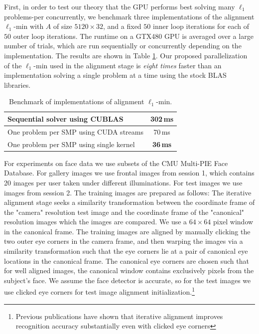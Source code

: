 \documentclass[10pt,twocolumn,letterpaper]{article}
\begin{document}
First, in order to test our theory that the GPU performs best solving many
$\ell_1$ problems-per concurrently, we benchmark three implementations of the
alignment $\ell_1$-min with $A$ of size $5120 \times 32$, and a fixed
$50$ inner loop iterations for each of $50$ outer loop iterations. The runtime
on a GTX480 GPU is averaged over a large number of trials, which are run
sequentially or concurrently depending on the implementation.
The results are shown in Table \ref{tbl:ubench}.
Our proposed parallelization of the $\ell_1$-min used in the alignment
stage is {\em eight times} faster than an implementation solving a single
problem at a time using the stock BLAS libraries.
\begin{table}[h!]
\caption{Benchmark of implementations of alignment $\ell_1$-min.}
\begin{tabular}{|l|c|}
\hline
Sequential solver using CUBLAS & 302\,ms \\
\hline
One problem per SMP using CUDA streams & 70\,ms  \\
\hline
One problem per SMP using single kernel & {\bf 36\,ms} \\
\hline
\end{tabular}
\label{tbl:ubench}
\end{table}
 
For experiments on face data we use subsets of the CMU Multi-PIE Face Database.
For gallery images we use frontal images from session 1, which contains 20
images per user taken under different illuminations. For test images we use
images from session 2.  The training images are prepared as follows:
The iterative alignment stage seeks a similarity
transformation between the coordinate frame of the "camera" resolution test
image and the coordinate frame of the "canonical" resolution images which the
images are compared.  We use a $64 \times 64$ pixel window in the canonical
frame.  The training images are aligned by manually clicking the two outer eye
corners in the camera frame, and then warping the images via a similarity
transformation such that the eye corners lie at a pair of canonical eye
locations in the canonical frame.  The canonical eye corners are chosen such
that for well aligned images, the canonical window contains exclusively pixels
from the subject's face.  We assume the face detector is accurate, so for the test
images we use clicked eye corners for test image alignment initialization.\footnote{Previous
publications have shown that iterative alignment improves recognition accuracy substantially
even with clicked eye corners}
\end{document}
